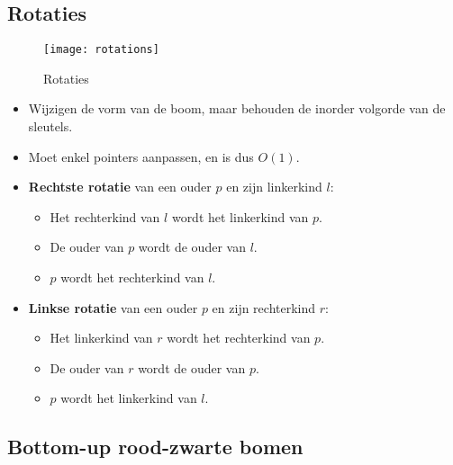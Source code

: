\subsection{Rotaties}
\begin{figure}[ht]
    \centering
    \texttt{[image: rotations]}
    \caption{Rotaties}
    \label{fig:rotations}
\end{figure}
\begin{itemize}
    \item Wijzigen de vorm van de boom, maar behouden de inorder volgorde van de sleutels.
    \item Moet enkel pointers aanpassen, en is dus $O(1)$.
    \item \textbf{Rechtste rotatie} van een ouder $p$ en zijn linkerkind $l$:
    \begin{itemize}
        \item Het rechterkind van $l$ wordt het linkerkind van $p$.
        \item De ouder van $p$ wordt de ouder van $l$.
        \item $p$ wordt het rechterkind van $l$. 
    \end{itemize}
    \item \textbf{Linkse rotatie} van een ouder $p$ en zijn rechterkind $r$:
    \begin{itemize}
        \item Het linkerkind van $r$ wordt het rechterkind van $p$.
        \item De ouder van $r$ wordt de ouder van $p$.
        \item $p$ wordt het linkerkind van $l$. 
    \end{itemize}
\end{itemize}

\subsection{Bottom-up rood-zwarte bomen}
